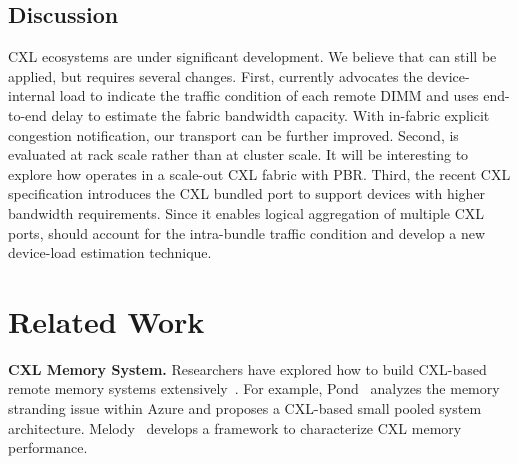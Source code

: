 \subsection{Discussion}
\label{subsec:eval-discussion}

CXL ecosystems are under significant development. We believe that \sys can still be applied, but requires several changes. First, \sys currently advocates the device-internal load to indicate the traffic condition of each remote DIMM and uses end-to-end delay to estimate the fabric bandwidth capacity. With in-fabric explicit congestion notification,
our transport can be further improved. Second, \sys is evaluated at rack scale rather than at cluster scale. It will be interesting to explore how \sys operates in a scale-out CXL fabric with PBR. 
Third, the recent CXL specification introduces the CXL bundled port to support devices with higher bandwidth requirements. Since it enables logical aggregation of multiple CXL ports, \sys should account for the intra-bundle traffic condition and develop a new device-load estimation technique.

\section{Related Work}
\label{sec:related}

{\bf CXL Memory System.} 
Researchers have explored how to build CXL-based remote memory systems extensively~\cite{directcxl-atc22, tpp-asplos23, cxl-chara-micro23, melody-asplos25, fcc-hotos23, pathfinder-sigcomm25, pond-asplos23, nomad-osdi24, memstrata-osdi24}. 
For example, 
Pond~\cite{pond-asplos23} analyzes the memory stranding issue within Azure and proposes a CXL-based small pooled system architecture. 
Melody~\cite{melody-asplos25} develops a framework to characterize
CXL memory performance. 

